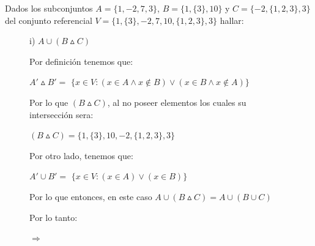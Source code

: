 \documentclass[10pt]{article}
\begin{document}
\begin{ej}

Dados los subconjuntos $A = \{1,-2,7, 3\}$, $B = \{1, \{3\}, 10\}$ y $C = \{-2, \{1, 2, 3\}, 3\}$ del conjunto
referencial $V = \{1, \{3\},-2, 7, 10, \{1, 2, 3\}, 3\}$ hallar:

\begin{itemize}
\begin{figure}[H]
\begin{minipage}[b]{0.6\linewidth}
		
		\item[i)] $A \cup  (B\vartriangle C)$
		
		\sffamily Por definición tenemos que: 
		
		\textcolor{B}{$A' \vartriangle B' = $ $\{ x \in V: (x \in A \land x \not\in B)\lor (x \in B \land x \not\in A)\}$}
		
		Por lo que $(B \vartriangle C)$, al no poseer elementos los cuales su intersección sera:
		
		  $(B \vartriangle C) = \{ 1, \{3\}, 10,-2, \{1, 2, 3\}, 3\}$
		   
		   Por otro lado, tenemos que:
		   
		   \textcolor{B}{$A' \cup B' = $ $\{ x \in V: (x \in A) \lor( x \in B)\}$} 
		  
		  Por lo que entonces, en este caso  $A \cup  (B\vartriangle C) = A \cup (B \cup C)$
		  
		  Por lo tanto:
		  
		   $\Rightarrow $ 
\end{minipage} 
\begin{minipage}[b]{0.4\linewidth}
		\centering
{}
\end{minipage}
\end{figure}
\end{itemize}
\end{ej}
\end{document}
